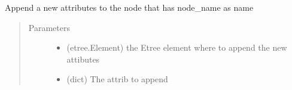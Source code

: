 \documentclass[a4paper,10pt,english]{sphinxmanual}
\begin{document}

\begin{fulllineitems}
\label{\detokenize{apidoc_src/src:src.xmlManager.append_node_attrib}}
Append a new attributes to the node that has node\_name as name
\begin{quote}\begin{description}
\item[{Parameters}] \leavevmode\begin{itemize}
\item {} 
 \textendash{} (etree.Element)
the Etree element where to append the new attibutes

\item {} 
 \textendash{} (dict) The attrib to append

\end{itemize}

\end{description}\end{quote}

\end{fulllineitems}

\end{document}
